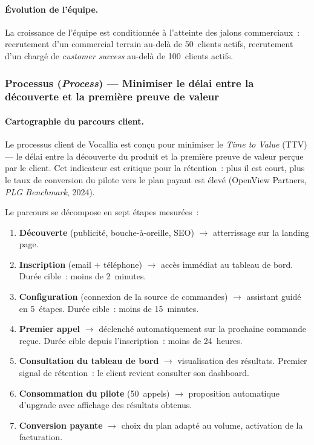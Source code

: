 \paragraph{Évolution de l'équipe.}
La croissance de l'équipe est conditionnée à l'atteinte des jalons commerciaux~:
recrutement d'un commercial terrain au-delà de 50~clients actifs, recrutement
d'un chargé de \textit{customer success} au-delà de 100~clients actifs.

\subsubsection{Processus (\textit{Process}) --- Minimiser le délai entre
la découverte et la première preuve de valeur}

\paragraph{Cartographie du parcours client.}
Le processus client de Vocallia est conçu pour minimiser le \textit{Time to Value}
(TTV) --- le délai entre la découverte du produit et la première preuve de valeur
perçue par le client. Cet indicateur est critique pour la rétention~: plus il
est court, plus le taux de conversion du pilote vers le plan payant est élevé
(OpenView Partners, \textit{PLG Benchmark}, 2024).

Le parcours se décompose en sept étapes mesurées~:

\begin{enumerate}
    \item \textbf{Découverte} (publicité, bouche-à-oreille, SEO) $\rightarrow$ atterrissage
    sur la landing page.
    \item \textbf{Inscription} (email + téléphone) $\rightarrow$ accès immédiat au tableau
    de bord. Durée cible~: moins de 2~minutes.
    \item \textbf{Configuration} (connexion de la source de commandes)
    $\rightarrow$ assistant guidé en 5~étapes. Durée cible~: moins de 15~minutes.
    \item \textbf{Premier appel} $\rightarrow$ déclenché automatiquement sur la prochaine
    commande reçue. Durée cible depuis l'inscription~: moins de 24~heures.
    \item \textbf{Consultation du tableau de bord} $\rightarrow$ visualisation des résultats.
    Premier signal de rétention~: le client revient consulter son dashboard.
    \item \textbf{Consommation du pilote} (50~appels) $\rightarrow$ proposition automatique
    d'upgrade avec affichage des résultats obtenus.
    \item \textbf{Conversion payante} $\rightarrow$ choix du plan adapté au volume, activation
    de la facturation.
\end{enumerate}

